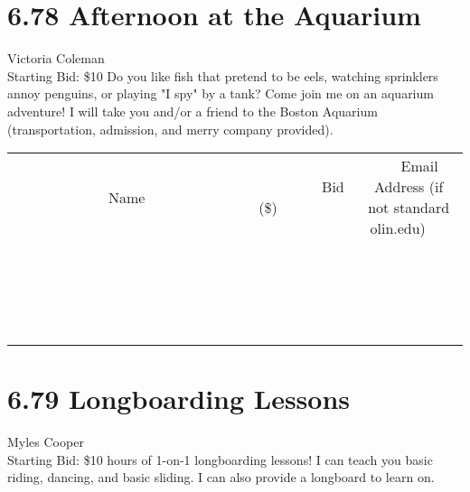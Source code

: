 \documentclass[11pt]{article}
\begin{document}
\section*{6.78 Afternoon at the Aquarium}
Victoria Coleman
\\
Starting Bid: \$10
\newline
Do you like fish that pretend to be eels, watching sprinklers annoy penguins, or playing "I spy" by a tank? Come join me on an aquarium adventure! I will take you and/or a friend to the Boston Aquarium (transportation, admission, and merry company provided).
\\[3ex]
\begin{tabular}{c c c}
~~~~~~~~~~~~~Name~~~~~~~~~~~~~ & ~~~~~~~~~Bid (\$)~~~~~~~~~  & ~~~Email Address (if not standard olin.edu)~~~\\
 & & \\
\hline
 & & \\
\hline
 & & \\
\hline
 & & \\
\hline
 & & \\
\hline
 & & \\
\hline
 & & \\
\hline
 & & \\
\hline
 & & \\
\hline
 & & \\
\hline
 & & \\
\hline
 & & \\
\hline
 & & \\
\hline
 & & \\
\hline
 & & \\
\hline
 & & \\
\hline
 & & \\
\hline
 & & \\
\hline
 & & \\
\hline
\end{tabular}
\newpage
\section*{6.79 Longboarding Lessons}
Myles Cooper
\\
Starting Bid: \$10
 hours of 1-on-1 longboarding lessons! I can teach you basic riding, dancing, and basic sliding. I can also provide a longboard to learn on.
\end{document}
